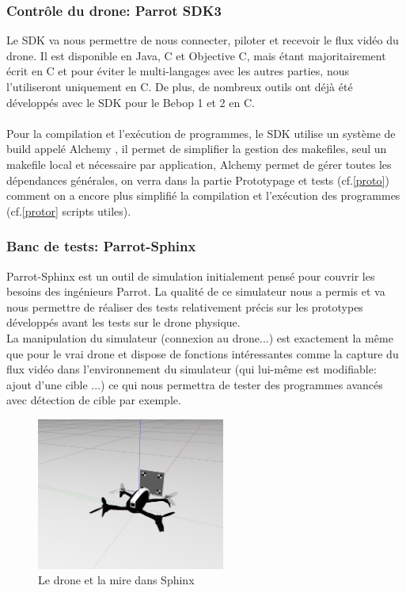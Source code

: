 \documentclass[12pt]{article}
\begin{document}
\subsubsection{Contrôle du drone: Parrot SDK3}
 Le SDK \cite{SDK} va nous permettre de nous connecter, piloter et recevoir le flux vidéo du drone. Il est disponible en Java, C et Objective C, mais étant majoritairement écrit en C et pour éviter le multi-langages avec les autres parties, nous l'utiliseront uniquement en C. De plus, de nombreux outils ont déjà été développés avec le SDK pour le Bebop 1 et 2 en C.\\~\\
 Pour la compilation et l'exécution de programmes, le SDK utilise un système de build appelé Alchemy \cite{alchemy}, il permet de simplifier la gestion des makefiles, seul un makefile local et nécessaire par application, Alchemy permet de gérer toutes les dépendances générales, on verra dans la partie Prototypage et tests (cf.\ref{proto}) comment on a encore plus simplifié la compilation et l'exécution des programmes (cf.\ref{protor} scripts utiles). 
 
\subsubsection{Banc de tests: Parrot-Sphinx}
Parrot-Sphinx \cite{sphinx} est un outil de simulation initialement pensé pour couvrir les besoins des ingénieurs Parrot. La qualité de ce simulateur nous a permis et va nous permettre de réaliser des tests relativement précis sur les prototypes développés avant les tests sur le drone physique.\\
La manipulation du simulateur (connexion au drone...) est exactement la même que pour le vrai drone et dispose de fonctions intéressantes comme la capture du flux vidéo dans l'environnement du simulateur (qui lui-même est modifiable: ajout d'une cible ...) ce qui nous permettra de tester des programmes avancés avec détection de cible par exemple.

\begin{figure}[H]
\centering
\includegraphics[height=5cm]{world.jpg}
\caption{Le drone et la mire dans Sphinx}
\end{figure}
\end{document}

